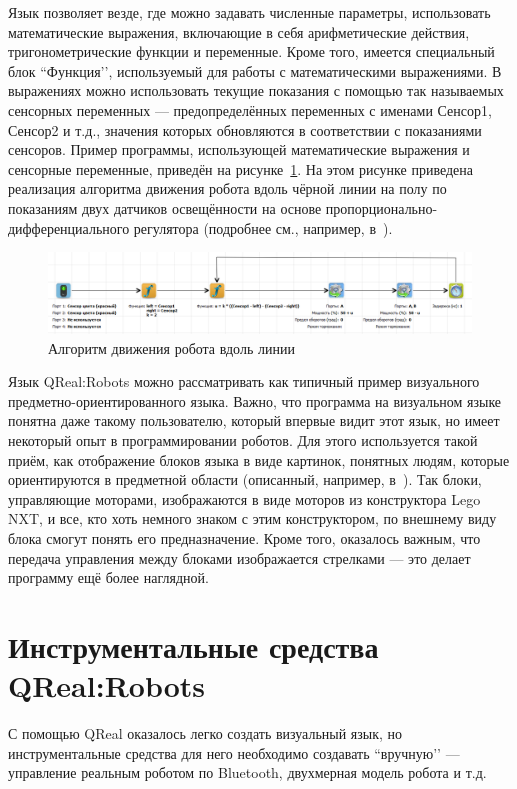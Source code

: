 \documentclass[a4paper]{article}
\begin{document}
Язык позволяет везде, где можно задавать численные параметры, использовать математические выражения, включающие в себя арифметические действия, тригонометрические функции и переменные. Кроме того, имеется специальный блок ``Функция’’, используемый для работы с математическими выражениями. В выражениях можно использовать текущие показания с помощью так называемых сенсорных переменных --- предопределённых переменных с именами Сенсор1, Сенсор2 и т.д., значения которых обновляются в соответствии с показаниями сенсоров. Пример программы, использующей математические выражения и сенсорные переменные, приведён на рисунке~\ref{movingAlongTheLine}. На этом рисунке приведена реализация алгоритма движения робота вдоль чёрной линии на полу по показаниям двух датчиков освещённости на основе пропорционально-дифференциального регулятора (подробнее см., например, в~\cite{filippov}).

\begin{figure} [ht]
  \begin{center}
    \includegraphics[width=\textwidth]{movingAlongTheLine.png}
    \caption{Алгоритм движения робота вдоль линии}
    \label{movingAlongTheLine}
  \end{center}
\end{figure}

Язык QReal:Robots можно рассматривать как типичный пример визуального предметно-ориентированного языка. Важно, что программа на визуальном языке понятна даже такому пользователю, который впервые видит этот язык, но имеет некоторый опыт в программировании роботов. Для этого используется такой приём, как отображение блоков языка в виде картинок, понятных людям, которые ориентируются в предметной области (описанный, например, в~\cite{theBook}). Так блоки, управляющие моторами, изображаются в виде  моторов из конструктора Lego NXT, и все, кто хоть немного знаком с этим конструктором, по внешнему виду блока смогут понять его предназначение. Кроме того, оказалось важным, что передача управления между блоками изображается стрелками --- это делает программу ещё более наглядной.

\section{Инструментальные средства QReal:Robots}
С помощью QReal оказалось легко создать визуальный язык, но инструментальные средства для него необходимо создавать ``вручную’’ --- управление реальным роботом по Bluetooth, двухмерная модель робота и т.д. 
\end{document}

